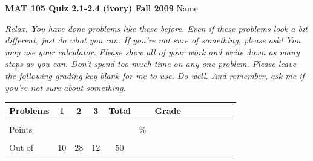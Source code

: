 \documentclass[12pt]{article}
\begin{document}
{\bf MAT 105 Quiz 2.1-2.4 (ivory) Fall 2009} \hspace{.4in} {\large Name} \hrulefill

\hrulefill

 \emph{Relax.  You have done problems like these before.  Even if these problems look a bit different, just do what you can.  If you're not sure of something, please ask! You may use your calculator.  Please show all of your work and write down as many steps as you can.  Don't spend too much time on any one problem.  Please leave the following grading key blank for me to use.  Do well.  And remember, ask me if you're not sure about something.}

\begin{center}

\begin{tabular}
{|l|c|c|c|c|c|c|c|c|c|c|c|c|} \hline

 Problems & \hspace{5 pt} 1 \hspace{5 pt}  & \hspace{5 pt} 2 \hspace{5 pt} & \hspace{5 pt} 3 \hspace{5 pt} &  \hspace{5 pt} Total  \hspace{5 pt} & &  \hspace{5 pt} Grade \hspace{5 pt}  \\ \hline
&&&&&&\\  
Points &&&&&    \hspace{.8in}\% &  \\ 
&&&&&& \\  \hline
Out of & 10 & 28 & 12 &50 & & \\ \hline

\end {tabular}

\end{center}

\hrulefill
\end{document}
